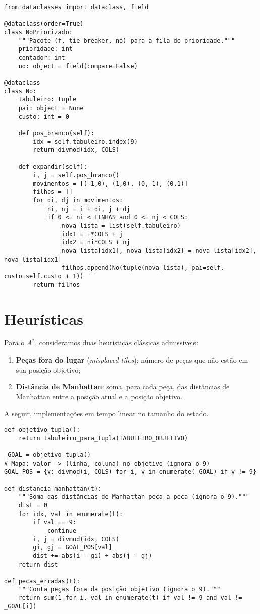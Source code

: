 \begin{verbatim}
from dataclasses import dataclass, field

@dataclass(order=True)
class NoPriorizado:
    """Pacote (f, tie-breaker, nó) para a fila de prioridade."""
    prioridade: int
    contador: int
    no: object = field(compare=False)

@dataclass
class No:
    tabuleiro: tuple
    pai: object = None
    custo: int = 0

    def pos_branco(self):
        idx = self.tabuleiro.index(9)
        return divmod(idx, COLS)

    def expandir(self):
        i, j = self.pos_branco()
        movimentos = [(-1,0), (1,0), (0,-1), (0,1)]
        filhos = []
        for di, dj in movimentos:
            ni, nj = i + di, j + dj
            if 0 <= ni < LINHAS and 0 <= nj < COLS:
                nova_lista = list(self.tabuleiro)
                idx1 = i*COLS + j
                idx2 = ni*COLS + nj
                nova_lista[idx1], nova_lista[idx2] = nova_lista[idx2], nova_lista[idx1]
                filhos.append(No(tuple(nova_lista), pai=self, custo=self.custo + 1))
        return filhos
\end{verbatim}


\section{Heurísticas}

Para o $A^*$, consideramos duas heurísticas clássicas admissíveis:
\begin{enumerate}[label=(\alph*),leftmargin=*,itemsep=0pt,topsep=2pt]
  \item \textbf{Peças fora do lugar} (\emph{misplaced tiles}): número de peças que não estão em sua posição objetivo;
  \item \textbf{Distância de Manhattan}: soma, para cada peça, das distâncias de Manhattan entre a posição atual e a posição objetivo.
\end{enumerate}
A seguir, implementações em tempo linear no tamanho do estado.

\begin{verbatim}
def objetivo_tupla():
    return tabuleiro_para_tupla(TABULEIRO_OBJETIVO)

_GOAL = objetivo_tupla()
# Mapa: valor -> (linha, coluna) no objetivo (ignora o 9)
GOAL_POS = {v: divmod(i, COLS) for i, v in enumerate(_GOAL) if v != 9}

def distancia_manhattan(t):
    """Soma das distâncias de Manhattan peça-a-peça (ignora o 9)."""
    dist = 0
    for idx, val in enumerate(t):
        if val == 9:
            continue
        i, j = divmod(idx, COLS)
        gi, gj = GOAL_POS[val]
        dist += abs(i - gi) + abs(j - gj)
    return dist

def pecas_erradas(t):
    """Conta peças fora da posição objetivo (ignora o 9)."""
    return sum(1 for i, val in enumerate(t) if val != 9 and val != _GOAL[i])
\end{verbatim}

